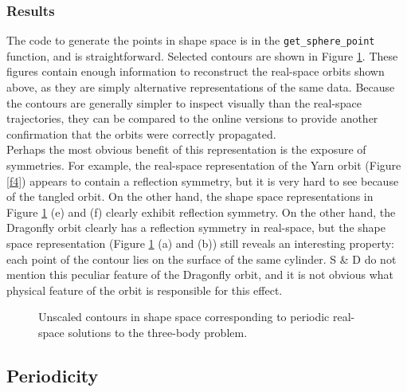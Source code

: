 \documentclass[12pt]{article}
\begin{document}
\subsubsection{Results}
The code to generate the points in shape space is in the \texttt{get\_sphere\_point} function, and is straightforward. Selected contours are shown in Figure \ref{f6}. These figures contain enough information to reconstruct the real-space orbits shown above, as they are simply alternative representations of the same data. Because the contours are generally simpler to inspect visually than the real-space trajectories, they can be compared to the online versions \cite{3bsite} to provide another confirmation that the orbits were correctly propagated. \\

Perhaps the most obvious benefit of this representation is the exposure of symmetries. For example, the real-space representation of the Yarn orbit (Figure \ref{f4}) appears to contain a reflection symmetry, but it is very hard to see because of the tangled orbit. On the other hand, the shape space representations in Figure \ref{f6} (e) and (f) clearly exhibit reflection symmetry. On the other hand, the Dragonfly orbit clearly has a reflection symmetry in real-space, but the shape space representation (Figure \ref{f6} (a) and (b)) still reveals an interesting property: each point of the contour lies on the surface of the same cylinder. S \& D do not mention this peculiar feature of the Dragonfly orbit, and it is not obvious what physical feature of the orbit is responsible for this effect.

\begin{figure}
 \qquad
{} \qquad
{} \qquad
{} \qquad
{} \qquad
{} \qquad
\caption{Unscaled contours in shape space corresponding to periodic real-space solutions to the three-body problem.}
\label{f6}
\end{figure}

\subsection{Periodicity}
\end{document}
